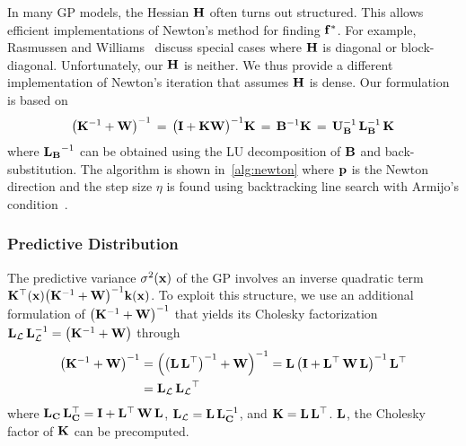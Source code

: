In many GP models, the Hessian \(\mathbf{H}\) often turns out structured.
This allows efficient implementations of Newton's method for finding \(\mathbf{f}^*\).
For example, Rasmussen and Williams~\cite{rasmussen_gaussian_2006} discuss special cases where \(\mathbf{H}\) is diagonal or block-diagonal.
Unfortunately, our \(\mathbf{H}\) is neither.
We thus provide a different implementation of Newton's iteration that assumes \(\mathbf{H}\) is dense.
Our formulation is based on 
{\small
\begin{align*}
  {\big(\mathbf{K}^{-1} + \mathbf{W}\big)}^{-1}
  \,=\, {{\big(\mathbf{I} + \mathbf{K} \mathbf{W} \big)}^{-1} \mathbf{K}}
  \,=\, \mathbf{B}^{-1} \mathbf{K} 
  \,=\, \mathbf{U}_{\mathbf{B}}^{-1} \, \mathbf{L}_{\mathbf{B}}^{-1} \, \mathbf{K}
\end{align*}
}%
{\noindent}where \({\mathbf{L}_{\mathbf{B}}}^{-1}\) can be obtained using the LU decomposition of \(\mathbf{B}\) and back-substitution.
The algorithm is shown in~\cref{alg:newton} where \(\mathbf{p}\) is the Newton direction and the step size \(\eta\) is found using backtracking line search with Armijo's condition~\cite{nocedal_numerical_2006}.

\subsubsection{Predictive Distribution}
The predictive variance \(\sigma^2(\mathbf{x})\) of the GP involves an inverse quadratic term \(\mathbf{K}^{\top}(\mathbf{x}) {\big(\mathbf{K}^{-1} + \mathbf{W}\big)}^{-1} \mathbf{k}(\mathbf{x})\).
To exploit this structure, we use an additional formulation of \({\big(\mathbf{K}^{-1} + \mathbf{W}\big)}^{-1}\) that yields its Cholesky factorization \(\mathbf{L}_{\mathcal{L}} \, \mathbf{L}^{-1}_{\mathcal{L}}  = {\big(\mathbf{K}^{-1} + \mathbf{W}\big)}\) through 
{
\begin{align*}
  {\big(\mK^{-1} + \mW\big)}^{-1}
  &= { \Big({\big(\mL\,\mL^{\top}\big)}^{-1} + \mW \Big) }^{-1} %
  = \mL\,{\big(\mI + \mL^{\top}\,\mW\,\mL \big)}^{-1}\,\mL^{\top}    \\
  &= \mL_{\mathcal{L}} \, { \mL_{\mathcal{L}} }^{\top} 
\end{align*}
}
where \(\mathbf{L}_{\mathbf{C}}\,\mathbf{L}_{\mathbf{C}}^{\top} = \mathbf{I} + \mathbf{L}^{\top}\,\mathbf{W}\,\mathbf{L}\), \(\mathbf{L}_{\mathcal{L}} = \mathbf{L}\,\mathbf{L}_{\mathbf{C}}^{-1}\), and \(\mathbf{K} = \mathbf{L}\,\mathbf{L}^{\top} \).
\(\mathbf{L}\), the Cholesky factor of \(\mathbf{K}\) can be precomputed.

